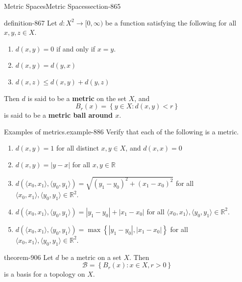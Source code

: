 \documentclass[oneside,10pt,]{article}
\newcommand{\terminology}[1]{\textbf{#1}}
\newcommand{\tuple}[1]{\langle #1 \rangle}
\newcommand{\mb}{\mathbb}
\newcommand{\mc}{\mathcal}
\newcommand{\setBuilder}[2]{\left\{#1:#2\right\}}
\newcommand{\setList}[1]{\left\{#1\right\}}
\newcommand{\lt}{<}
\begin{document}
\begin{sectionptx}{Metric Spaces}{}{Metric Spaces}{}{}{section-865}
\begin{definition}{}{definition-867}%
\hypertarget{p-868}{}%
Let \(d:X^2\to[0,\infty)\) be a function satisfying the following for all \(x,y,z\in X\).%
\leavevmode%
\begin{enumerate}
\item\hypertarget{li-872}{}\(d(x,y)=0\) if and only if \(x=y\).%
\item\hypertarget{li-875}{}\(d(x,y)=d(y,x)\)%
\item\hypertarget{li-877}{}\(d(x,z)\leq d(x,y)+d(y,z)\)%
\end{enumerate}
\hypertarget{p-879}{}%
Then \(d\) is said to be a \terminology{metric} on the set \(X\), and%
\begin{equation*}
B_r(x)=\setBuilder{y\in X}{d(x,y)\lt r}
\end{equation*}
is said to be a \terminology{metric ball around \(x\)}.%
\end{definition}
\begin{example}{Examples of metrics.}{example-886}%
\hypertarget{p-888}{}%
Verify that each of the following is a metric.%
\leavevmode%
\begin{enumerate}
\item\hypertarget{li-890}{}\(d(x,y)=1\) for all distinct \(x,y\in X\), and \(d(x,x)=0\)%
\item\hypertarget{li-894}{}\(d(x,y)=|y-x|\) for all \(x,y\in\mb R\)%
\item\hypertarget{li-897}{}\(d(\tuple{x_0,x_1},\tuple{y_0,y_1})=\sqrt{(y_1-y_0)^2+(x_1-x_0)^2}\) for all \(\tuple{x_0,x_1},\tuple{y_0,y_1}\in\mb R^2\).%
\item\hypertarget{li-900}{}\(d(\tuple{x_0,x_1},\tuple{y_0,y_1})=|y_1-y_0|+|x_1-x_0|\) for all \(\tuple{x_0,x_1},\tuple{y_0,y_1}\in\mb R^2\).%
\item\hypertarget{li-903}{}\(d(\tuple{x_0,x_1},\tuple{y_0,y_1})=\max\setList{|y_1-y_0|,|x_1-x_0|}\) for all \(\tuple{x_0,x_1},\tuple{y_0,y_1}\in\mb R^2\).%
\end{enumerate}
\end{example}
\begin{theorem}{}{}{theorem-906}%
\hypertarget{p-907}{}%
Let \(d\) be a metric on a set \(X\). Then%
\begin{equation*}
\mc B=\setBuilder{B_r(x)}{x\in X,r>0}
\end{equation*}
is a basis for a topology on \(X\).%
\end{theorem}

\end{sectionptx}
\end{document}
